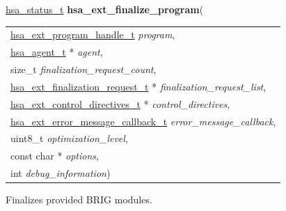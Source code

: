 \documentclass[final]{book}
\newcommand{\hsaarg}[1]{\textit{#1}}
\begin{document}
\noindent\begin{tcolorbox}[breakable,nobeforeafter,colframe=white,colback=lightgray,left=0mm]
\hyperlink{group__status_1gad755322e7ff95456520e8abdbe90d225}{hsa_status_t} \hypertarget{group__HsailLinkerServiceLayer_1ga267f430531f3f6d2f72b5edd0d070729}{\textbf{hsa_ext_finalize_program}}(
\vspace{-3.5mm}\begin{longtable}{@{}p{\textwidth}}
\hspace{1.7em}\hyperlink{group__HsailLinkerServiceLayer_1gaea8d90863414407ddba7e318db7412f9}{hsa_ext_program_handle_t} \hsaarg{program},\\
\hspace{1.7em}\hyperlink{group__topology_1gab8db3fb886332a24acac08ec361e1d86}{hsa_agent_t} * \hsaarg{agent},\\
\hspace{1.7em}size_t \hsaarg{finalization_request_count},\\
\hspace{1.7em}\hyperlink{group__FinalizerCoreApi_1ga670c94fee80740017464110a40775b33}{hsa_ext_finalization_request_t} * \hsaarg{finalization_request_list},\\
\hspace{1.7em}\hyperlink{group__FinalizerCoreApi_1ga40c83573be6c1e21ad46ff8a7edd21b0}{hsa_ext_control_directives_t} * \hsaarg{control_directives},\\
\hspace{1.7em}\hyperlink{group__FinalizerCoreApi_1gace3d3971c5289675c4f88ce0045db41f}{hsa_ext_error_message_callback_t} \hsaarg{error_message_callback},\\
\hspace{1.7em}uint8_t \hsaarg{optimization_level},\\
\hspace{1.7em}const char * \hsaarg{options},\\
\hspace{1.7em}int \hsaarg{debug_information})\end{longtable}

\end{tcolorbox}
Finalizes provided BRIG modules.
\end{document}
